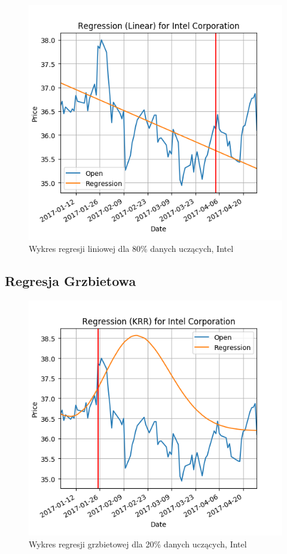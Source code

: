 \begin{figure}[h!]
\centering
\includegraphics[width=150mm]{pictures/plots/intel_linear_80.png}
\caption{Wykres regresji liniowej dla 80\% danych uczących, Intel}
\label{fig:Wykres regresji liniowej dla 80\% danych uczących, Intel}
\end{figure}

\subsection{Regresja Grzbietowa}

\begin{figure}[h!]
\centering
\includegraphics[width=150mm]{pictures/plots/intel_krr_20.png}
\caption{Wykres regresji grzbietowej dla 20\% danych uczących, Intel}
\label{fig:Wykres regresji grzbietowej dla 20\% danych uczących, Intel}
\end{figure}

